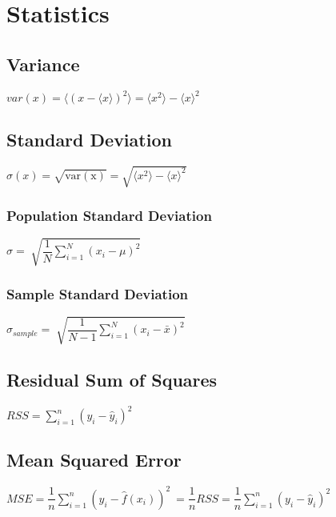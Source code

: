 \chapter{Statistics}



	\section{Variance}
\begin{itemize}
\itemt \( var(x) = \langle (x - \langle x \rangle)^2 \rangle =\langle x^2 \rangle - \langle x \rangle^2 \)
\end{itemize}		


	\section{Standard Deviation}
\begin{itemize}
\itemt \( \sigma(x) = \sqrt{\mathrm{var(x)}} = \sqrt{\langle x^2 \rangle - \langle x \rangle^2} \)
\end{itemize}

		\subsection{Population Standard Deviation}
\begin{itemize}
\itemt \( \sigma = \sqrt[]{\dfrac{1}{N} \sum\limits^N_{i=1}(x_i - \mu)^2} \)
\end{itemize}

		\subsection{Sample Standard Deviation}
\begin{itemize}
\itemt \( \sigma_{sample} = \sqrt[]{\dfrac{1}{N-1} \sum\limits^N_{i=1}(x_i - \bar{x})^2} \)
\end{itemize}

	\section{Residual Sum of Squares}
\begin{itemize}
\itemt \( RSS = \sum\limits_{i=1}^n (y_i - \hat{y}_i)^2 \)
\end{itemize}


	\section{Mean Squared Error}
\begin{itemize}
\itemt \( MSE = \dfrac{1}{n}\sum\limits_{i=1}^n (y_i - \hat{f}(x_i))^2 \ = \dfrac{1}{n}RSS = \dfrac{1}{n}\sum\limits_{i=1}^n (y_i - \hat{y}_i)^2 \)
\end{itemize}


